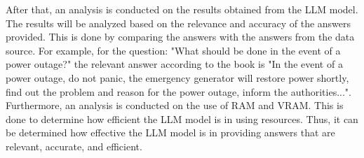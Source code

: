 After that, an analysis is conducted on the results obtained from the LLM model. The results will be analyzed based on the relevance and accuracy of the answers provided. This is done by comparing the answers with the answers from the data source. For example, for the question: "What should be done in the event of a power outage?" the relevant answer according to the book is "In the event of a power outage, do not panic, the emergency generator will restore power shortly, find out the problem and reason for the power outage, inform the authorities...". Furthermore, an analysis is conducted on the use of RAM and VRAM. This is done to determine how efficient the LLM model is in using resources. Thus, it can be determined how effective the LLM model is in providing answers that are relevant, accurate, and efficient.












